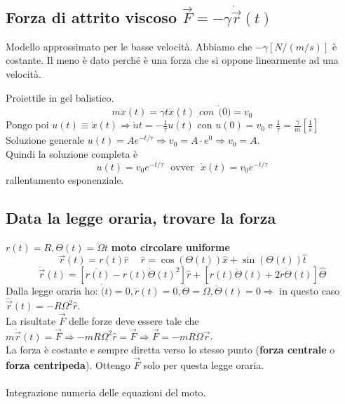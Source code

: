 \subsection{Forza di attrito viscoso $\vec{F} = -\gamma\dot{\vec{r}}(t)$}
Modello approssimato per le basse velocità. Abbiamo che $-\gamma [N/(m/s)]$ è costante. Il meno è dato perché è una forza
che si oppone linearmente ad una velocità.
\begin{example}
    Proiettile in gel balistico.
    $$m\ddot{x}(t) = \gamma t \dot{x}(t) \:\: con \:\: \dot(0) = v_0$$
    Pongo poi $u(t) \equiv \dot{x}(t) \Rightarrow \dot{u} t = -\frac{1}{\tau}u(t)$ con $u(0) = v_0$ e $\frac{1}{\tau} = \frac{\gamma}{m}[\frac{1}{s}]$\\
    Soluzione generale $u(t) = A e^{-t/\tau} \Rightarrow v_0 = A \cdot e^0 \Rightarrow v_0 = A$.\\
    Quindi la soluzione completa è
    $$u(t) = v_0 e^{-t/\tau} \:\:\: \text{ovver} \:\:\: \dot{x}(t) = v_0 e^{-t/\tau}$$
    rallentamento esponenziale.
\end{example}

\subsection{Data la legge oraria, trovare la forza}
$r(t) = R, \Theta(t) = \Omega t$ \textbf{moto circolare uniforme}
$$\vec{r}(t) = r(t)\hat{r}\hspace{15pt}\hat{r} = \cos(\Theta(t))\hat{x} + \sin(\Theta(t))\hat{t}$$
$$\ddot{\vec{r}} (t) = [\ddot{r(t)} - r(t)\dot{\Theta}(t)^2]\hat{r} + [r(t)\ddot{\Theta}(t) + 2\dot{r}\dot{\Theta}(t)]\hat{\Theta}$$
Dalla legge oraria ho: $\dot(t) = 0, \ddot{r}(t) = 0, \dot{\Theta} = \Omega, \ddot{\Theta}(t) = 0 \Rightarrow$ in questo caso $\ddot{\vec{r}}(t) = -R\Omega^2\hat{r}$.\\
La risultate $\vec{F}$ delle forze deve essere tale che $m\ddot{\vec{r}}(t) = \vec{F} \Rightarrow -mR\Omega^2\hat{r} = \vec{F} \Rightarrow \vec{F} = -mR\Omega\vec{r}$.\\
La forza è costante e sempre diretta verso lo stesso punto (\textbf{forza centrale} o  \textbf{forza centripeda}). Ottengo $\vec{F}$ solo per questa legge oraria.\\\\
Integrazione numeria delle equazioni del moto.

